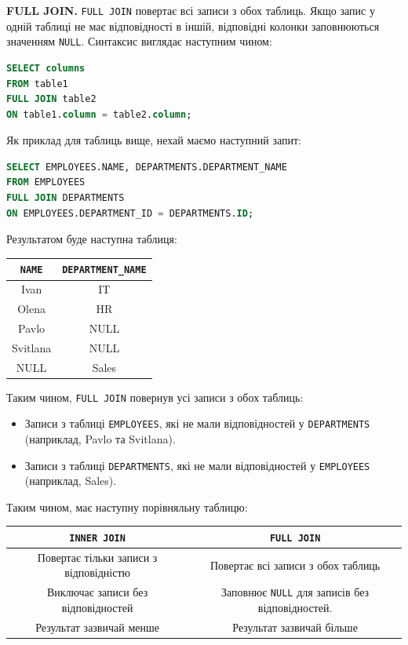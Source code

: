 \documentclass{hw_template}
\begin{document}
\textbf{FULL JOIN.} \texttt{FULL JOIN} повертає всі записи з обох таблиць. Якщо
запис у одній таблиці не має відповідності в іншій, відповідні колонки
заповнюються значенням \texttt{NULL}. Синтаксис виглядає наступним чином:
\begin{lstlisting}[language=SQL]
SELECT columns
FROM table1
FULL JOIN table2
ON table1.column = table2.column;
\end{lstlisting}

Як приклад для таблиць вище, нехай маємо наступний запит:
\begin{lstlisting}[language=SQL]
SELECT EMPLOYEES.NAME, DEPARTMENTS.DEPARTMENT_NAME
FROM EMPLOYEES
FULL JOIN DEPARTMENTS
ON EMPLOYEES.DEPARTMENT_ID = DEPARTMENTS.ID;
\end{lstlisting}

Результатом буде наступна таблиця:

\begin{center}
    \begin{tabular}{|c|c|}
        \hline
        \texttt{NAME} & \texttt{DEPARTMENT\_NAME} \\
        \hline
        Ivan & IT \\
        Olena & HR \\
        Pavlo & NULL \\
        Svitlana & NULL \\
        NULL & Sales \\
        \hline
    \end{tabular}
\end{center}

Таким чином, \texttt{FULL JOIN} повернув усі записи з обох таблиць: 
\begin{itemize}
    \item Записи з таблиці \texttt{EMPLOYEES}, які не мали відповідностей у
    \texttt{DEPARTMENTS} (наприклад, Pavlo та Svitlana).
    \item Записи з таблиці \texttt{DEPARTMENTS}, які не мали відповідностей у
    \texttt{EMPLOYEES} (наприклад, Sales).
\end{itemize}

Таким чином, має наступну порівняльну таблицю:

\begin{center}
    \begin{tabular}{|c|c|}
        \hline
        \texttt{INNER JOIN} & \texttt{FULL JOIN} \\
        \hline
        Повертає тільки записи з відповідністю & Повертає всі записи з обох таблиць \\
        Виключає записи без відповідностей & Заповнює \texttt{NULL} для записів без відповідностей. \\
        Результат зазвичай менше & Результат зазвичай більше \\
        \hline
    \end{tabular}
\end{center}
\end{document}
